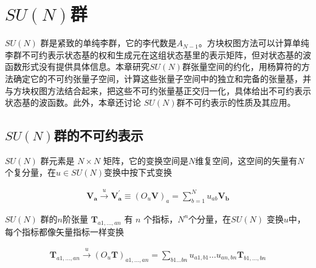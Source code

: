 
\setcounter{chapter}{7}

\chapter{$SU(N)$群}

$SU(N)$ 群是紧致的单纯李群，它的李代数是$A_{N-1}$。方块权图方法可以计算单纯李群不可约表示状态基的权和生成元在这组状态基里的表示矩阵，但对状态基的波函数形式没有提供具体信息。本章研究$SU(N)$群张量空间的约化，用杨算符的方法确定它的不可约张量子空间，计算这些张量子空间中的独立和完备的张量基，并与方块权图方法结合起来，把这些不可约张量基正交归一化，具体给出不可约表示状态基的波函数。此外，本章还讨论 $SU(N)​$群不可约表示的性质及其应用。

\section{$SU(N)$群的不可约表示}

$SU(N)$ 群元素是 $N \times N$ 矩阵，它的变换空间是$N$维复空间，这空间的矢量有$N$个复分量，在$u \in SU(N)$变换中按下式变换

\begin{newprop}
\begin{equation}\begin{aligned}
\label{eq.8.1.1}
\mathbf{V_a}  \stackrel{u}{\to} 
\mathbf{V^\prime_a} \equiv (O_u \mathbf{V})_a=
\sum\limits_{b=1}^N u_{ab} \mathbf{V_b}
\end{aligned}\end{equation}
\end{newprop}


$SU(N)$ 群的$n$阶张量 $\mathbf{T}_{a1,\ldots,an}$ 有 $n$ 个指标，$N^n$个分量，在$SU(N)$ 变换$u$中，每个指标都像矢量指标一样变换

\begin{newprop}
\begin{equation}\begin{aligned}
\label{eq.8.1.2}
\mathbf{T}_{a1,\ldots,an} \stackrel{u}{\to} 
(O_u \mathbf{T})_{a1,\ldots,an}=\sum\limits_{b1\ldots bn}
u_{a1,b1}\ldots u_{an,bn}\mathbf{T}_{b1,\ldots,bn}
\end{aligned}\end{equation}
\end{newprop}

